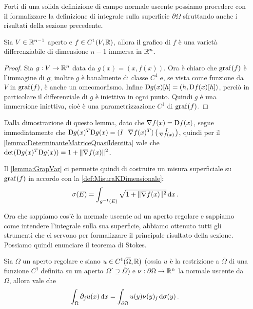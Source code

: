 Forti di una solida definizione di campo normale uscente possiamo procedere con il formalizzare la definizione di integrale sulla superficie $\partial\Omega$ sfruttando anche i risultati della sezione precedente.

\begin{lemma}\label{lemma:GrapVar}
	Sia $V\in\mathbb R^{n-1}$ aperto e $f\in C^1(V,\mathbb R)$, allora il grafico di $f$ è una varietà differenziabile di dimensione $n-1$ immersa in $\mathbb R^n$.
\end{lemma}
\begin{proof}
	Sia $g:V\rightarrow \mathbb R^n$ data da $g(x)=(x,f(x))$. Ora è chiaro che $\operatorname{graf}(f)$ è l'immagine di $g$; inoltre $g$ è banalmente di classe $C^1$
	e, se vista come funzione da $V$ in $\operatorname{graf}(f)$, è anche un omeomorfismo. Infine $\mathrm D g(x)[h]=(h,\mathrm D f(x)[h])$, perciò in particolare il differenziale di $g$ è
	iniettivo in ogni punto. Quindi $g$ è una immersione iniettiva, cioè è una parametrizzazione $C^1$ di $\operatorname{graf}(f)$.
\end{proof}

\begin{remark}
	Dalla dimostrazione di questo lemma, dato che $\nabla f(x)=\mathrm D f(x)$, segue immediatamente che $\mathrm D g(x)^T \mathrm D g(x)=
	(I \ \ \nabla f(x)^T)
	\left(\begin{smallmatrix}
	I \\
	\nabla f(x)
	\end{smallmatrix}\right)$, quindi per il \cref{lemma:DeterminanteMatriceQuasiIdentita} vale che $\det (\mathrm D g(x)^T \mathrm D g(x)) = 1+\lVert\nabla f(x)\rVert^2$. 
\end{remark}

Il \cref{lemma:GrapVar} ci permette quindi di costruire un misura superficiale su $\operatorname{graf}(f)$ in accordo con la \cref{def:MisuraKDimensionale}:
\begin{equation}\label{eq:MisuraSuperficialeGrafico}
	\sigma(E)=\int_{g^{-1}(E)} \sqrt{1+\lVert\nabla f(x)\rVert^2} \,\mathrm d x\, \text{. }
\end{equation}


Ora che sappiamo cos'è la normale uscente ad un aperto regolare e sappiamo come intendere l'integrale sulla sua superficie,
abbiamo ottenuto tutti gli strumenti che ci servono per formalizzare il principale risultato della sezione. Possiamo quindi enunciare il teorema di Stokes.

\begin{theorem}\label{thm:Stokes}
	Sia $\Omega$ un aperto regolare e siano $u\in C^1(\overline\Omega,\mathbb R)$ (ossia $u$ è la restrizione a $\overline\Omega$ di una funzione $C^1$ definita su un aperto
	$\Omega'\supseteq \overline\Omega$) e $\nu:\partial \Omega \rightarrow \mathbb R^n$ la normale uscente da $\Omega$, allora vale che
	\begin{equation}\label{eq:FormulaStokes}
		\int_{\Omega} \partial_j u(x) \,\mathrm d x = \int_{\partial \Omega} u(y)\nu(y)_j \,\mathrm d \sigma(y)\, \text{. }
	\end{equation}
\end{theorem}

